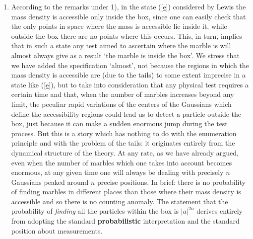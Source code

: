 \documentclass[10pt,a4paper]{article}
\begin{document}
\begin{enumerate}
\item According to the remarks under 1), in the state (\ref{e})
considered by Lewis the mass density is accessible only inside the
box, since one can easily check that the only points in space
where the mass is accessible lie inside it, while outside the box
there are no points where this occurs. This, in turn, implies that
in such a state any test aimed to ascertain where the marble is
will almost always give as a result `the marble is inside the
box'. We stress that we have added the specification `almost', not
because the regions in which the mass density is accessible are
(due to the tails) to some extent imprecise in a state like
(\ref{e}), but to take into consideration that any physical test
requires a certain time and that, when the number of marbles
increases beyond any limit, the peculiar rapid variations of the
centers of the Gaussians which define the accessibility regions
could lead us  to detect a particle outside the box, just because
it can make a sudden enormous jump during the test process. But
this is a story which has nothing to do with the enumeration
principle and with the problem of the tails: it originates
entirely from the dynamical structure of the theory. At any rate,
as we have already argued, even when the number of marbles which
one takes into account becomes enormous, at any given time one
will always be dealing with precisely $n$ Gaussians peaked around
$n$ precise positions. In brief: there is no probability of
finding marbles in different places than those where their mass
density is accessible and so there is no counting anomaly. The
statement that the probability of {\it finding} all the particles
within the box is $|a|^{2n}$ derives entirely from adopting the
standard {\bf probabilistic} interpretation and the standard
position about measurements.


\end{enumerate}
\end{document}
